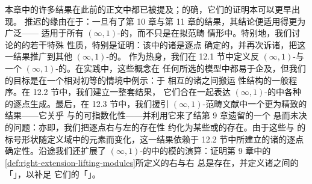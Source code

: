 本章中的许多结果在此前的正文中都已被提及；的确，它们的证明本可以更早出现。
推迟的缘由在于：一旦有了第 10 章与第 11 章的结果，其结论便适用得更为广泛——
适用于所有 $(\infty,1)$-\trCategory{}的\trInfinityCosmos，而不只是在拟范畴
情形中。特别地，我们讨论\trQuasiCategory{}的\trInfinityCosmos{}的若干特殊
性质，特别是证明：该\trInfinityCosmos{}中的诸\trUniversalProperty{}是逐点
确定的，并再次诉诸\trModelIndependence，把这一结果推广到其他%
$(\infty,1)$-\trCategory{}的\trInfinityCosmos。
作为热身，我们在 12.1 节中定义反 $(\infty,1)$-\trCategory{}与一个%
$(\infty,1)$-\trCategory{}的\trInfinityGroupoidCore。在实践中，这些概念在
任何所选的模型中都易于企及，但我们的目标是在一个相对初等的情境中例示：于
相互\trBiequivalence{}的诸\trInfinityCosmos{}之间搬运%
\trInfinityCategory{}性结构的一般程序。在 12.2 节中，我们建立一整套结果，
它们合在一起表达 $(\infty,1)$-\trCategory{}的\trInfinityCosmos{}中各种%
\trUniversalProperty{}的逐点生成。最后，在 12.3 节中，我们援引%
$(\infty,1)$-范畴文献中一个更为精致的结果——它关乎\trCartesianFibration{}%
与\trCocartesianFibration{}的可指数化性——并利用它来了结第 9 章遗留的一个
悬而未决的问题：亦即，我们把逐点右\trExtension{}与左\trExtension{}的存在性
约化为某些\trLimit{}或\trColimit{}的存在。由于这些\trLimit{}与\trColimit{}%
的标号形状随\trPointwiseExtension{}定义域中的元素而变化，这一结果依赖于
12.2 节中所建立的诸\trUniversalProperty{}的逐点确定性。沿途我们还扩展了%
$(\infty,1)$-\trCategory{}的\trInfinityCosmos{}中的模的演算：证明第 9 章中的%
\cref{def:right-extension-lifting-modules}所定义的右\trExtension{}与右%
\trLifting{}总是存在，并定义诸\trModule{}之间的「\trInternalHom」，以补足
它们的「\trTensorProduct」。

